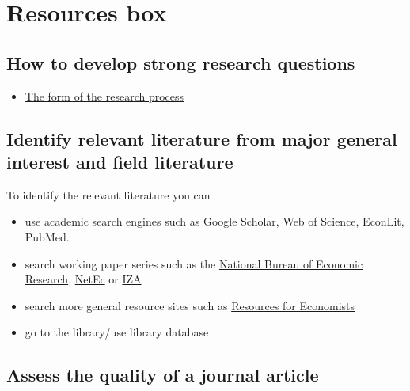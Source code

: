 \documentclass[
]{book}
\providecommand{\tightlist}{%
  \setlength{\itemsep}{0pt}\setlength{\parskip}{0pt}}
\begin{document}
\hypertarget{resources-box-1}{%
\section{Resources box}\label{resources-box-1}}

\hypertarget{how-to-develop-strong-research-questions}{%
\subsection{How to develop strong research
questions}\label{how-to-develop-strong-research-questions}}

\begin{itemize}
\tightlist
\item
  \href{https://www.economicsnetwork.ac.uk/handbook/ugresearch/31}{The
  form of the research process}
\end{itemize}

\hypertarget{identify-relevant-literature-from-major-general-interest-and-field-literature}{%
\subsection{Identify relevant literature from major general interest and
field
literature}\label{identify-relevant-literature-from-major-general-interest-and-field-literature}}

To identify the relevant literature you can

\begin{itemize}
\tightlist
\item
  use academic search engines such as Google Scholar, Web of Science,
  EconLit, PubMed. 
\item
  search working paper series such as the \href{www.nber.org}{National
  Bureau of Economic Research},
  \href{http://netec.wustl.edu/NetEc.html}{NetEc} or
  \href{www.iza.org}{IZA}
\item
  search more general resource sites such as
  \href{http://rfe.org}{Resources for Economists}
\item
  go to the library/use library database
\end{itemize}

\hypertarget{assess-the-quality-of-a-journal-article}{%
\subsection{Assess the quality of a journal
article}\label{assess-the-quality-of-a-journal-article}}
\end{document}

